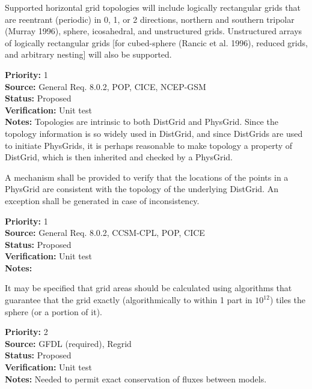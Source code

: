  Supported horizontal grid topologies will include
logically rectangular grids that are reentrant (periodic) in 0, 1, or 2 directions,
northern and southern tripolar (Murray 1996), sphere, icosahedral, and unstructured
grids.  Unstructured arrays of logically rectangular grids [for cubed-sphere (Rancic
et al. 1996), reduced grids, and arbitrary nesting] will also be supported.
\begin{reqlist}
{\bf Priority:} 1 \\
{\bf Source:} General Req. 8.0.2, POP, CICE, NCEP-GSM \\
{\bf Status:} Proposed \\
{\bf Verification:} Unit test\\
{\bf Notes:}  Topologies are intrinsic to both DistGrid and PhysGrid.  Since
the topology information is so widely used in DistGrid, and since DistGrids
are used to initiate PhysGrids, it is perhaps reasonable to make topology a
property of DistGrid, which is then inherited and checked by a PhysGrid.
\end{reqlist}

A mechanism shall be provided to verify that the locations of the points in
a PhysGrid are consistent with the topology of the underlying DistGrid.  An
exception shall be generated in case of inconsistency.
\begin{reqlist}
{\bf Priority:} 1 \\
{\bf Source:} General Req. 8.0.2, CCSM-CPL, POP, CICE \\
{\bf Status:} Proposed \\
{\bf Verification:} Unit test\\
{\bf Notes:}
\end{reqlist}

It may be specified that grid areas should be calculated using algorithms that
guarantee that the grid exactly (algorithmically to within 1 part in $10^{12}$) tiles
the sphere (or a portion of it). 
\begin{reqlist}
{\bf Priority:} 2 \\
{\bf Source:} GFDL (required), Regrid \\
{\bf Status:} Proposed \\
{\bf Verification:} Unit test\\
{\bf Notes:} Needed to permit exact conservation of fluxes between models.
\end{reqlist}

